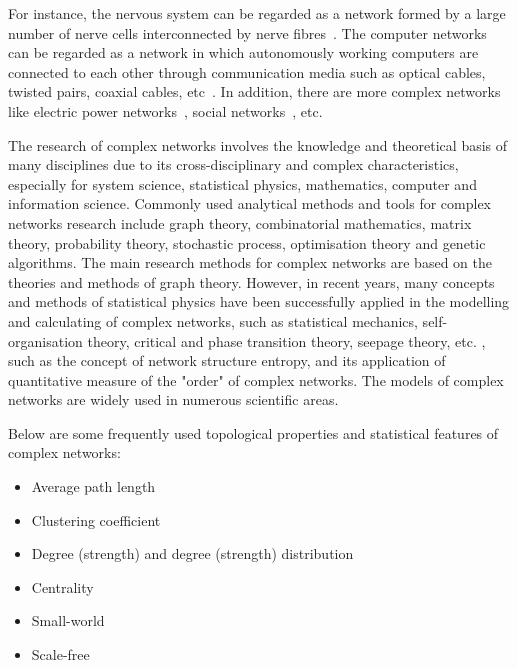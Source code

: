 For instance, the nervous system can be regarded as a network formed by a large number of nerve cells interconnected by nerve fibres~\cite{watts1998collective}. The computer networks can be regarded as a network in which autonomously working computers are connected to each other through communication media such as optical cables, twisted pairs, coaxial cables, etc~\cite{watts1998collective}. In addition, there are more complex networks like electric power networks~\cite{faloutsos1999power}, social networks~\cite{watts1998collective, hofman2017prediction, ebel2002scale}, etc.

The research of complex networks involves the knowledge and theoretical basis of many disciplines due to its cross-disciplinary and complex characteristics, especially for system science, statistical physics, mathematics, computer and information science. Commonly used analytical methods and tools for complex networks research include graph theory, combinatorial mathematics, matrix theory, probability theory, stochastic process, optimisation theory and genetic algorithms. The main research methods for complex networks are based on the theories and methods of graph theory. However, in recent years, many concepts and methods of statistical physics have been successfully applied in the modelling and calculating of complex networks, such as statistical mechanics, self-organisation theory, critical and phase transition theory, seepage theory, etc. \cite{albert2002statistical}, such as the concept of network structure entropy, and its application of quantitative measure of the "order" of complex networks. The models of complex networks are widely used in numerous scientific areas.


\vline

Below are some frequently used topological properties and statistical features of complex networks:

\begin{itemize}
	\item Average path length
	\item Clustering coefficient
	\item Degree (strength) and degree (strength) distribution
	\item Centrality
	\item Small-world
	\item Scale-free
\end{itemize}

\vline


